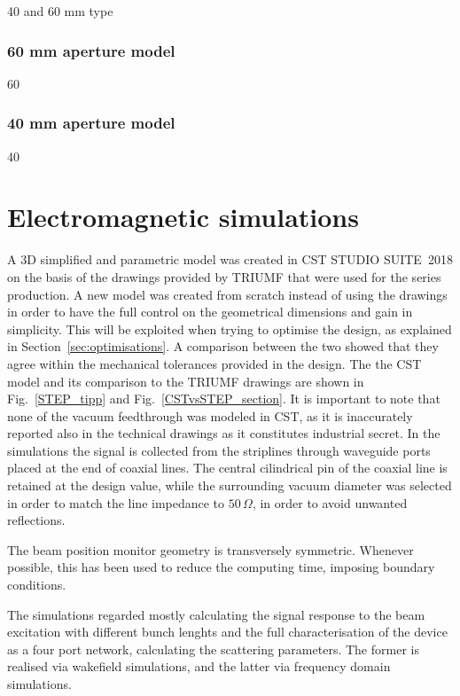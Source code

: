 40 and 60 mm type

\subsubsection[60 mm aperture model]{60 mm aperture model}

60

\subsubsection[40 mm aperture model]{40 mm aperture model}

40



\section[Electromagnetic simulations]{Electromagnetic simulations}

A 3D simplified and parametric model was created in CST STUDIO SUITE\textregistered~2018 on the basis of the drawings provided by TRIUMF that were used for the series production. A new model was created from scratch instead of using the drawings in order to have the full control on the geometrical dimensions and gain in simplicity. This will be exploited when trying to optimise the design, as explained in Section~\ref{sec:optimisations}. A comparison between the two showed that they agree within the mechanical tolerances provided in the design. The the CST model and its comparison to the TRIUMF drawings are shown in Fig.~\ref{STEP_tipp} and Fig.~\ref{CSTvsSTEP_section}. It is important to note that none of the vacuum feedthrough was modeled in CST, as it is inaccurately reported also in the technical drawings as it constitutes industrial secret. In the simulations the signal is collected from the striplines through waveguide ports placed at the end of coaxial lines. The central cilindrical pin of the coaxial line is retained at the design value, while the surrounding vacuum diameter was selected in order to match the line impedance to $50\,\Omega$, in order to avoid unwanted reflections.

The beam position monitor geometry is transversely symmetric. Whenever possible, this has been used to reduce the computing time, imposing boundary conditions.

The simulations regarded mostly calculating the signal response to the beam excitation with different bunch lenghts and the full characterisation of the device as a four port network, calculating the scattering parameters. The former is realised via wakefield simulations, and the latter via frequency domain simulations.


